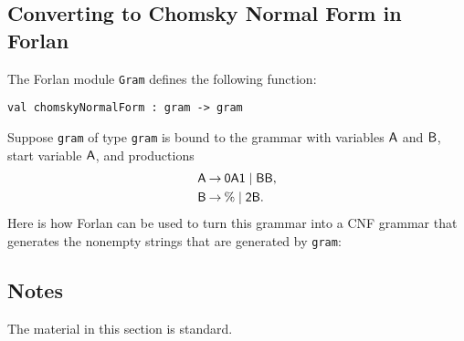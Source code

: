\subsection*{Converting to Chomsky Normal Form in Forlan}

The Forlan module \texttt{Gram} defines the following function:
\begin{verbatim}
val chomskyNormalForm : gram -> gram
\end{verbatim}
%

Suppose \texttt{gram} of type \texttt{gram} is bound to the grammar with
variables $\mathsf{A}$ and $\mathsf{B}$, start variable $\mathsf{A}$, and productions
\begin{align*}
  \mathsf{A} &\mathbin{\to} \mathsf{0A1} \mid \mathsf{BB} , \\
  \mathsf{B} &\mathbin{\to} \% \mid \mathsf{2B} .
\end{align*}
Here is how Forlan can be used to turn this grammar into a CNF
grammar that generates the nonempty strings that are generated by
\texttt{gram}:


\subsection{Notes}

The material in this section is standard.

